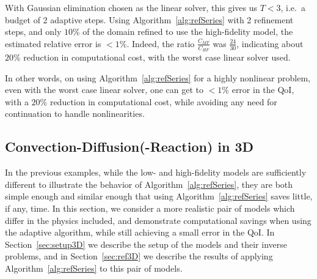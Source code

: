 {With Gaussian elimination chosen as the linear solver, this gives us $T < 3$, i.e.\ a budget of 2 adaptive steps. Using Algorithm~\ref{alg:refSeries} with 2 refinement steps, and only $10\%$ of the domain refined to use the high-fidelity model, the estimated relative error is $<1\%$. Indeed, the ratio $\frac{C_{MF}}{C_{HF}}$ was $\frac{24}{30}$, indicating about $20\%$ reduction in computational cost, with the worst case linear solver used. 

In other words, on using Algorithm~\ref{alg:refSeries} for a highly nonlinear problem, even with the worst case linear solver, one can get to $<1\%$ error in the QoI, with a $20\%$ reduction in computational cost, while avoiding any need for continuation to handle nonlinearities. }

\subsection{Convection-Diffusion(-Reaction) in 3D} \label{sec:cdvcdr3D}

In the previous examples, while the low- and high-fidelity models are sufficiently different to illustrate the behavior of Algorithm~\ref{alg:refSeries}, they are both simple enough and similar enough that using Algorithm~\ref{alg:refSeries} saves little, if any, time. In this section, we consider a more realistic pair of models which differ in the physics included, and demonstrate computational savings when using the adaptive algorithm, while still achieving a small error in the QoI. In Section~\ref{sec:setup3D} we describe the setup of the models and their inverse problems, and in Section~\ref{sec:ref3D} we describe the results of applying Algorithm~\ref{alg:refSeries} to this pair of models.


